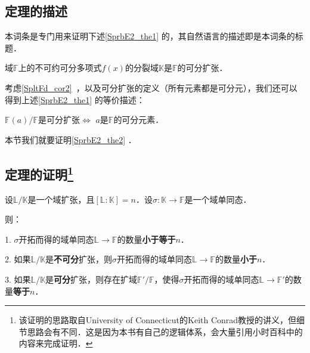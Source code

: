 

\subsection{定理的描述}

本词条是专门用来证明下述\autoref{SprbE2_the1} 的，其自然语言的描述即是本词条的标题．

\begin{theorem}{}\label{SprbE2_the1}
域$\mathbb{F}$上的不可约可分多项式$f(x)$的分裂域$\mathbb{K}$是$\mathbb{F}$的可分扩张．
\end{theorem}

考虑\autoref{SpltFd_cor2}~，以及可分扩张的定义（所有元素都是可分元），我们还可以得到上述\autoref{SprbE2_the1} 的等价描述：

\begin{theorem}{}\label{SprbE2_the2}
$\mathbb{F}(a)/\mathbb{F}$是可分扩张$\iff$ $a$是$\mathbb{F}$的可分元素．
\end{theorem}

本节我们就要证明\autoref{SprbE2_the2} ．




\subsection{定理的证明\footnote{该证明的思路取自University of Connecticut的Keith Conrad教授的讲义，但细节思路会有不同．这是因为本书有自己的逻辑体系，会大量引用小时百科中的内容来完成证明．}}

\begin{lemma}{}\label{SprbE2_lem1}
设$\mathbb{L}/\mathbb{K}$是一个域扩张，且$[\mathbb{L}:\mathbb{K}]=n$．设$\sigma:\mathbb{K}\to\mathbb{F}$是一个域单同态．

则：

1. $\sigma$开拓而得的域单同态$\mathbb{L}\to\mathbb{F}$的数量\textbf{小于等于}$n$．

2. 如果$\mathbb{L}/\mathbb{K}$是\textbf{不可分}扩张，则$\sigma$开拓而得的域单同态$\mathbb{L}\to\mathbb{F}$的数量\textbf{小于}$n$．

3. 如果$\mathbb{L}/\mathbb{K}$是\textbf{可分}扩张，则存在扩域$\mathbb{F}'/\mathbb{F}$，使得$\sigma$开拓而得的域单同态$\mathbb{L}\to\mathbb{F}'$的数量\textbf{等于}$n$．

\end{lemma}




